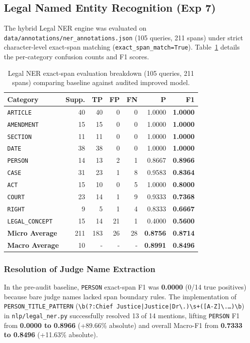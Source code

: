 \documentclass[10pt,twocolumn]{article}
\begin{document}
\subsection{Legal Named Entity Recognition (Exp 7)}
The hybrid Legal NER engine was evaluated on \texttt{data/annotations/ner\_annotations.json} (105 queries, 211 spans) under strict character-level exact-span matching (\texttt{exact\_span\_match=True}). Table~\ref{tab:ner_breakdown} details the per-category confusion counts and F1 scores.

\begin{table}[t]
\centering
\small
\caption{Legal NER exact-span evaluation breakdown (105 queries, 211 spans) comparing baseline against audited improved model.}
\begin{tabularx}{\columnwidth}{lrrrrrr}
\toprule
\textbf{Category} & \textbf{Supp.} & \textbf{TP} & \textbf{FP} & \textbf{FN} & \textbf{P} & \textbf{F1} \\
\midrule
\texttt{ARTICLE}       & 40 & 40 &  0 & 0 & 1.0000 & \textbf{1.0000} \\
\texttt{AMENDMENT}     & 15 & 15 &  0 & 0 & 1.0000 & \textbf{1.0000} \\
\texttt{SECTION}       & 11 & 11 &  0 & 0 & 1.0000 & \textbf{1.0000} \\
\texttt{DATE}          & 38 & 38 &  0 & 0 & 1.0000 & \textbf{1.0000} \\
\texttt{PERSON}        & 14 & 13 &  2 & 1 & 0.8667 & \textbf{0.8966} \\
\texttt{CASE}          & 31 & 23 &  1 & 8 & 0.9583 & \textbf{0.8364} \\
\texttt{ACT}           & 15 & 10 &  0 & 5 & 1.0000 & \textbf{0.8000} \\
\texttt{COURT}         & 23 & 14 &  1 & 9 & 0.9333 & \textbf{0.7368} \\
\texttt{RIGHT}         &  9 &  5 &  1 & 4 & 0.8333 & \textbf{0.6667} \\
\texttt{LEGAL\_CONCEPT}& 15 & 14 & 21 & 1 & 0.4000 & \textbf{0.5600} \\
\midrule
\textbf{Micro Average} & 211 & 183 & 26 & 28 & \textbf{0.8756} & \textbf{0.8714} \\
\textbf{Macro Average} & 10 & - & - & - & \textbf{0.8991} & \textbf{0.8496} \\
\bottomrule
\end{tabularx}
\label{tab:ner_breakdown}
\end{table}

\subsubsection{Resolution of Judge Name Extraction}
In the pre-audit baseline, \texttt{PERSON} exact-span F1 was \textbf{0.0000} (0/14 true positives) because bare judge names lacked span boundary rules. The implementation of \texttt{PERSON\_TITLE\_PATTERN} (\texttt{\textbackslash b(?:Chief Justice|Justice|Dr\textbackslash.)\textbackslash s+([A-Z]\textbackslash.\dots)\textbackslash b}) in \texttt{nlp/legal\_ner.py} successfully resolved 13 of 14 mentions, lifting \texttt{PERSON} F1 from \textbf{0.0000 to 0.8966} (+89.66\% absolute) and overall Macro-F1 from \textbf{0.7333 to 0.8496} (+11.63\% absolute).
\end{document}
